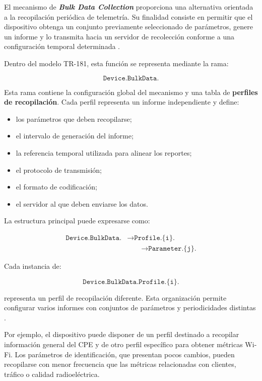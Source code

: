El mecanismo de \textbf{\textit{Bulk Data Collection}} proporciona una
alternativa orientada a la recopilación periódica de telemetría. Su
finalidad consiste en permitir que el dispositivo obtenga un conjunto
previamente seleccionado de parámetros, genere un informe y lo transmita
hacia un servidor de recolección conforme a una configuración temporal
determinada \cite{bbf_tr181}.

Dentro del modelo TR-181, esta función se representa mediante la rama:

\[
    \texttt{Device.BulkData.}
\]

Esta rama contiene la configuración global del mecanismo y una tabla de
\textbf{perfiles de recopilación}. Cada perfil representa un informe
independiente y define:

\begin{itemize}
    \item los parámetros que deben recopilarse;
    \item el intervalo de generación del informe;
    \item la referencia temporal utilizada para alinear los reportes;
    \item el protocolo de transmisión;
    \item el formato de codificación;
    \item el servidor al que deben enviarse los datos.
\end{itemize}

La estructura principal puede expresarse como:

\[
\begin{aligned}
    \texttt{Device.BulkData.}
    &\longrightarrow
    \texttt{Profile.\{i\}.}\\
    &\qquad\longrightarrow
    \texttt{Parameter.\{j\}.}
\end{aligned}
\]

Cada instancia de:

\[
    \texttt{Device.BulkData.Profile.\{i\}.}
\]

representa un perfil de recopilación diferente. Esta organización permite
configurar varios informes con conjuntos de parámetros y periodicidades
distintas \cite{bbf_tr181}.

Por ejemplo, el dispositivo puede disponer de un perfil destinado a
recopilar información general del CPE y de otro perfil específico para
obtener métricas Wi-Fi. Los parámetros de identificación, que presentan
pocos cambios, pueden recopilarse con menor frecuencia que las métricas
relacionadas con clientes, tráfico o calidad radioeléctrica.

